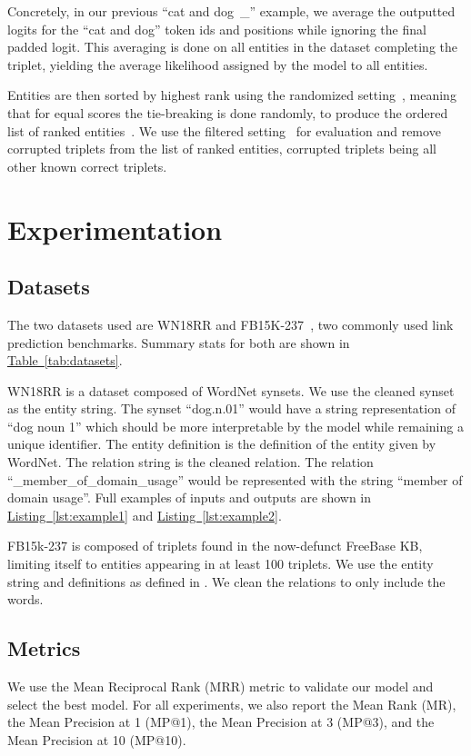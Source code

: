 \documentclass[11pt,a4paper]{article}
\newcommand{\CiteT}[1]{\citet{#1}} \newcommand{\CiteP}[1]{~\citep{#1}} \newcommand{\CodeT}[1]{\texttt{#1}}
\newcommand{\RefTable}[1]{\hyperref[#1]{Table~\ref{#1}}}
\newcommand{\RefListing}[1]{\hyperref[#1]{Listing~\ref{#1}}}
\begin{document}
Concretely, in our previous ``cat and dog~\_'' example, we average the outputted logits for the ``cat and dog'' token ids and positions while ignoring the final padded logit.
This averaging is done on all entities in the dataset completing the triplet, yielding the average likelihood assigned by the model to all entities.

Entities are then sorted by highest rank using the randomized setting\CiteP{ReevaluationKB}, meaning that for equal scores the tie-breaking is done randomly, to produce the ordered list of ranked entities~.
We use the filtered setting\CiteP{FB15k} for evaluation and remove corrupted triplets from the list of ranked entities, corrupted triplets being all other known correct triplets.

\section{Experimentation}
\subsection{Datasets}
The two datasets used are WN18RR and FB15K-237\CiteP{FB15k,FB15k-237,WN18RR,wordnet,FreeBase}, two commonly used link prediction benchmarks.
Summary stats for both are shown in \RefTable{tab:datasets}.

WN18RR is a dataset composed of WordNet synsets.
We use the cleaned synset as the entity string.
The synset ``dog.n.01'' would have a string representation of ``dog noun 1'' which should be more interpretable by the model while remaining a unique identifier.
The entity definition is the definition of the entity given by WordNet.
The relation string is the cleaned relation.
The relation ``\_member\_of\_domain\_usage'' would be represented with the string ``member of domain usage''.
Full examples of inputs and outputs are shown in \RefListing{lst:example1} and \RefListing{lst:example2}.

FB15k-237 is composed of triplets found in the now-defunct FreeBase KB, limiting itself to entities appearing in at least 100 triplets.
We use the entity string and definitions as defined in \CiteT{FBdefinitions}. 
We clean the relations to only include the words.


\subsection{Metrics}\label{sec:metrics}
We use the Mean Reciprocal Rank (MRR) metric to validate our model and select the best model.
For all experiments, we also report the Mean Rank (MR), the Mean Precision at 1 (MP@1), the Mean Precision at 3 (MP@3), and the Mean Precision at 10 (MP@10).
\end{document}
